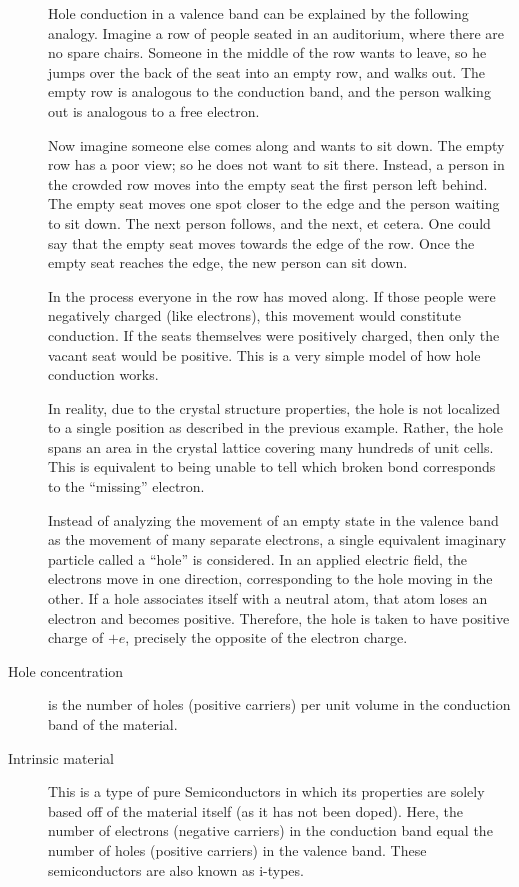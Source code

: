 \documentclass{../lab}
\begin{document}
\begin{description}
    Hole conduction in a valence band can be explained by the following analogy. Imagine a row of people seated in an auditorium, where there are no spare chairs. Someone in the middle of the row wants to leave, so he jumps over the back of the seat into an empty row, and walks out. The empty row is analogous to the conduction band, and the person walking out is analogous to a free electron.

    Now imagine someone else comes along and wants to sit down. The empty row has a poor view; so he does not want to sit there. Instead, a person in the crowded row moves into the empty seat the first person left behind. The empty seat moves one spot closer to the edge and the person waiting to sit down. The next person follows, and the next, et cetera. One could say that the empty seat moves towards the edge of the row. Once the empty seat reaches the edge, the new person can sit down.

    In the process everyone in the row has moved along. If those people were negatively charged (like electrons), this movement would constitute conduction. If the seats themselves were positively charged, then only the vacant seat would be positive. This is a very simple model of how hole conduction works.

    In reality, due to the crystal structure properties, the hole is not localized to a single position as described in the previous example. Rather, the hole spans an area in the crystal lattice covering many hundreds of unit cells. This is equivalent to being unable to tell which broken bond corresponds to the ``missing'' electron.

    Instead of analyzing the movement of an empty state in the valence band as the movement of many separate electrons, a single equivalent imaginary particle called a ``hole'' is considered. In an applied electric field, the electrons move in one direction, corresponding to the hole moving in the other. If a hole associates itself with a neutral atom, that atom loses an electron and becomes positive. Therefore, the hole is taken to have positive charge of $+e$, precisely the opposite of the electron charge.

    \item[Hole concentration] is the number of holes (positive carriers) per unit volume in the conduction band of the material.

    \item[Intrinsic material] This is a type of pure Semiconductors in which its properties are solely based off of the material itself (as it has not been doped). Here, the number of electrons (negative carriers) in the conduction band equal the number of holes (positive carriers) in the valence band. These semiconductors are also known as i-types.


\end{description}
\end{document}
